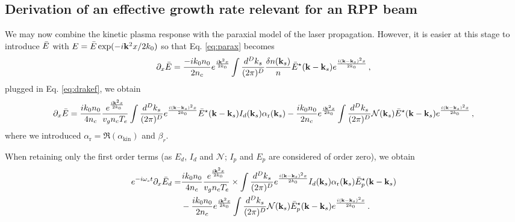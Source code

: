 \documentclass[
 reprint,
 amsmath,amssymb,
 aps,
]{revtex4-1}
\begin{document}
\subsection{Derivation of an effective growth rate relevant for an  RPP beam}
 \begin{widetext}
We may now combine the kinetic plasma response  with the paraxial model of  the laser propagation. 
However, it  is easier at this stage to introduce $\Bar{E}$ with  $E=\Bar{E}\exp(-i \mathbf{k}^2x /2k_0)$ so that Eq. \eqref{eq:parax} becomes
\begin{equation}
    \partial_x \Bar{E}  =\frac{-ik_0n_0}{2n_c} e^{\frac{i\mathbf{k}^2x }{2k_0}}\int \frac{d^Dk_s}{(2\pi)^D} \frac{\delta n(\mathbf{k}_s)}{n} \Bar{E}^\star(\mathbf{k}-\mathbf{k}_s) e^{ \frac{i(\mathbf{k}-\mathbf{k}_s)^2x}{2k_0}}\, ,  \label{eq:paraxbar}
\end{equation}
 plugged in Eq. \eqref{eq:drakef}, we obtain
\begin{align}
    \partial_x \Bar{E}  =\frac{ik_0n_0}{4n_c} \frac{e^{\frac{i\mathbf{k}^2 x}{2k_0}}}{  v_g n_c T_e}
    \int \frac{d^Dk_s}{(2\pi)^D}  e^{ \frac{i(\mathbf{k}-\mathbf{k}_s)^2x}{2k_0}} \Bar{E}^\star(\mathbf{k}-\mathbf{k}_s) 
   I_d(\mathbf{k}_s) \alpha_\mathrm{r}   (\mathbf{k}_s) 
   -\frac{ik_0n_0}{2n_c} e^{\frac{i\mathbf{k}^2x }{2k_0}}\int \frac{d^Dk_s}{(2\pi)^D} \mathcal{N}(\mathbf{k}_s) \Bar{E}^\star(\mathbf{k}-\mathbf{k}_s) e^{ \frac{i(\mathbf{k}-\mathbf{k}_s)^2x}{2k_0}}\, ,  \label{eq:paraxbar}
\end{align}
where we introduced $\alpha_\mathrm{r}=\Re(\alpha_\mathrm{kin} )$ and $\beta_r$. 

 When retaining only the first order terms (as $E_d$, $I_d$ and $\mathcal{N}$; $I_p$ and $E_p$ are considered of order zero), we obtain 
 \begin{align}
   e^{-i\omega_s t}\partial_x \Bar{E}_d  =&\frac{ik_0n_0}{4n_c} \frac{e^{\frac{i\mathbf{k}^2 x}{2k_0}}}{  v_g n_c T_e} \times 
   \int \frac{d^Dk_s}{(2\pi)^D} 
   e^{ \frac{i(\mathbf{k}-\mathbf{k}_s)^2x}{2k_0}}
   I_d(\mathbf{k}_s) \alpha_\mathrm{r}   (\mathbf{k}_s) \Bar{E}_p^\star(\mathbf{k}-\mathbf{k}_s) \nonumber\\
    &-\frac{ik_0n_0}{2n_c} e^{\frac{i\mathbf{k}^2x }{2k_0}}\int \frac{d^Dk_s}{(2\pi)^D} \mathcal{N}(\mathbf{k}_s) \Bar{E}_p^\star(\mathbf{k}-\mathbf{k}_s) e^{ \frac{i(\mathbf{k}-\mathbf{k}_s)^2x}{2k_0}}
   \, .  \label{eq:paraxbar}
\end{align}


\end{widetext}
\end{document}

